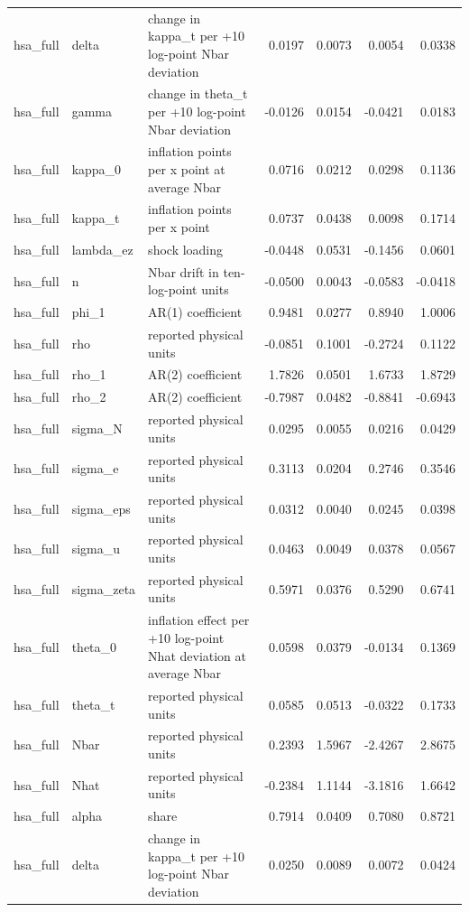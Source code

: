 \begin{tabular}{lllrrrr}
hsa\_full & delta & change in kappa\_t per +10 log-point Nbar deviation & 0.0197 & 0.0073 & 0.0054 & 0.0338 \\
hsa\_full & gamma & change in theta\_t per +10 log-point Nbar deviation & -0.0126 & 0.0154 & -0.0421 & 0.0183 \\
hsa\_full & kappa\_0 & inflation points per x point at average Nbar & 0.0716 & 0.0212 & 0.0298 & 0.1136 \\
hsa\_full & kappa\_t & inflation points per x point & 0.0737 & 0.0438 & 0.0098 & 0.1714 \\
hsa\_full & lambda\_ez & shock loading & -0.0448 & 0.0531 & -0.1456 & 0.0601 \\
hsa\_full & n & Nbar drift in ten-log-point units & -0.0500 & 0.0043 & -0.0583 & -0.0418 \\
hsa\_full & phi\_1 & AR(1) coefficient & 0.9481 & 0.0277 & 0.8940 & 1.0006 \\
hsa\_full & rho & reported physical units & -0.0851 & 0.1001 & -0.2724 & 0.1122 \\
hsa\_full & rho\_1 & AR(2) coefficient & 1.7826 & 0.0501 & 1.6733 & 1.8729 \\
hsa\_full & rho\_2 & AR(2) coefficient & -0.7987 & 0.0482 & -0.8841 & -0.6943 \\
hsa\_full & sigma\_N & reported physical units & 0.0295 & 0.0055 & 0.0216 & 0.0429 \\
hsa\_full & sigma\_e & reported physical units & 0.3113 & 0.0204 & 0.2746 & 0.3546 \\
hsa\_full & sigma\_eps & reported physical units & 0.0312 & 0.0040 & 0.0245 & 0.0398 \\
hsa\_full & sigma\_u & reported physical units & 0.0463 & 0.0049 & 0.0378 & 0.0567 \\
hsa\_full & sigma\_zeta & reported physical units & 0.5971 & 0.0376 & 0.5290 & 0.6741 \\
hsa\_full & theta\_0 & inflation effect per +10 log-point Nhat deviation at average Nbar & 0.0598 & 0.0379 & -0.0134 & 0.1369 \\
hsa\_full & theta\_t & reported physical units & 0.0585 & 0.0513 & -0.0322 & 0.1733 \\
hsa\_full & Nbar & reported physical units & 0.2393 & 1.5967 & -2.4267 & 2.8675 \\
hsa\_full & Nhat & reported physical units & -0.2384 & 1.1144 & -3.1816 & 1.6642 \\
hsa\_full & alpha & share & 0.7914 & 0.0409 & 0.7080 & 0.8721 \\
hsa\_full & delta & change in kappa\_t per +10 log-point Nbar deviation & 0.0250 & 0.0089 & 0.0072 & 0.0424 \\

\end{tabular}
